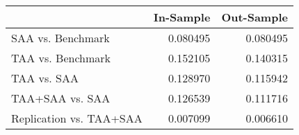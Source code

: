 \begin{tabular}{lrr}
\toprule
{} &  In-Sample &  Out-Sample \\
\midrule
SAA vs. Benchmark       &   0.080495 &    0.080495 \\
TAA vs. Benchmark       &   0.152105 &    0.140315 \\
TAA vs. SAA             &   0.128970 &    0.115942 \\
TAA+SAA vs. SAA         &   0.126539 &    0.111716 \\
Replication vs. TAA+SAA &   0.007099 &    0.006610 \\
\bottomrule
\end{tabular}
